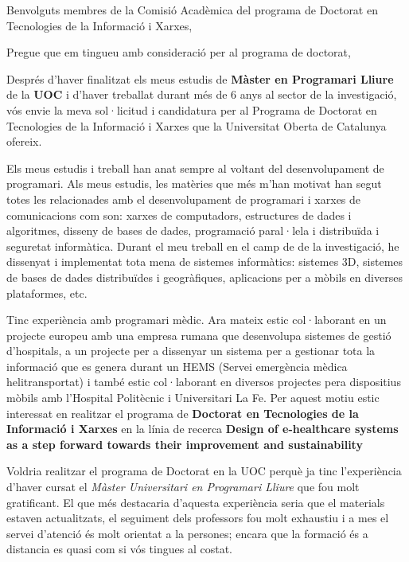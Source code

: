 
%
%


\date{\today}
\opening{Benvolguts membres de la Comisió Acadèmica del programa de Doctorat en Tecnologies de la Informació i Xarxes,}
\closing{Pregue que em tingueu amb consideració per al programa de doctorat,}




\makelettertitle

Després d'haver finalitzat els meus estudis de \textbf{Màster en Programari Lliure} de la \textbf{UOC} i d'haver treballat durant més de 6 anys al sector de la investigació, vós envie la meva sol·licitud i candidatura per al Programa de Doctorat en Tecnologies de la Informació i Xarxes que la Universitat Oberta de Catalunya ofereix.

Els meus estudis i treball han anat sempre al voltant del desenvolupament de programari. Als meus estudis, les matèries que més m'han motivat han segut totes les relacionades amb el desenvolupament de programari i xarxes de comunicacions com son: xarxes de computadors, estructures de dades i algoritmes, disseny de bases de dades, programació paral·lela i distribuïda i seguretat informàtica. Durant el meu treball en el camp de de la investigació, he dissenyat i implementat tota mena de sistemes informàtics: sistemes 3D, sistemes de bases de dades distribuïdes i geogràfiques, aplicacions per a mòbils en diverses plataformes, etc.

Tinc experiència amb programari mèdic. Ara mateix estic col·laborant en un projecte europeu amb una empresa rumana que desenvolupa sistemes de gestió d'hospitals, a un projecte per a dissenyar un sistema per a gestionar tota la informació que es genera durant un HEMS (Servei emergència mèdica helitransportat) i també estic col·laborant en diversos projectes pera dispositius mòbils amb l'Hospital Politècnic i Universitari La Fe.  Per aquest motiu estic interessat en realitzar el programa de \textbf{Doctorat en Tecnologies de la Informació i Xarxes} en la línia de recerca \textbf{Design of e-healthcare systems as a step forward towards their improvement and sustainability} 

Voldria realitzar el programa de Doctorat en la UOC perquè ja tinc l'experiència d'haver cursat el \textit{Màster Universitari en Programari Lliure} que fou molt gratificant. El que més destacaria d'aquesta experiència seria que el materials estaven actualitzats, el seguiment dels professors fou molt exhaustiu i a mes el servei d'atenció és molt orientat a la persones; encara que la formació és a distancia es quasi com si vós tingues al costat. 

\makeletterclosing

\clearpage
